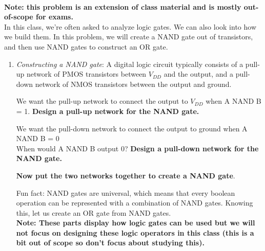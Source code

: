 
 \\
\textbf{Note: this problem is an extension of class material and is mostly out-of-scope for exams.} \\
In this class, we're often asked to analyze logic gates. We can also look into how we build them. In this problem, we will create a NAND gate out of transistors, and then use NAND gates to construct an OR gate.
\begin{enumerate}
    \item \textit{Constructing a NAND gate}: A digital logic circuit typically consists of a pull-up network of PMOS transistors between $V_{DD}$ and the output, and a pull-down network of NMOS transistors between the output and ground. 
    \begin{enumerate}
        \qitem We want the pull-up network to connect the output to $V_{DD}$ when A NAND B = 1.
        \textbf{Design a pull-up network for the NAND gate.} \\
        \sol{
        
        }

        \ws{\vspace{120px}}

        \qitem We want the pull-down network to connect the output to ground when A NAND B = 0 \\
        When would A NAND B output 0? \textbf{Design a pull-down network for the NAND gate.} \\

        \ws{\vspace{120px}}

        \qitem \textbf{Now put the two networks together to create a NAND gate}. \\
        \sol{}

        \ws{\vspace{180px}}

    \end{enumerate}
    Fun fact: NAND gates are universal, which means that every boolean operation can be represented with a combination of NAND gates. Knowing this, let us create an OR gate from NAND gates. \\

    \textbf{Note: These parts display how logic gates can be used but we will not focus on designing these logic operators in this class (this is a bit out of scope so don’t focus about studying this).}


\end{enumerate}
